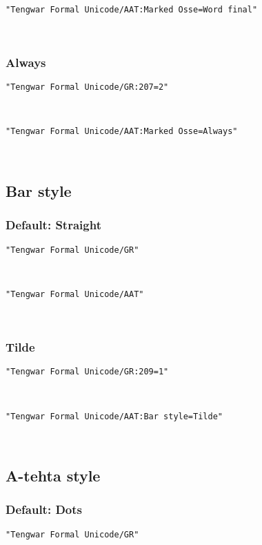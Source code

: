 \documentclass[11pt,a4paper]{article}
\begin{document}
\formalGRossefinal 

\noindent \texttt{"Tengwar Formal Unicode/AAT:Marked Osse=Word final"}

\formalAATossefinal 

\subsubsection{Always}

\texttt{"Tengwar Formal Unicode/GR:207=2"}

\formalGRossealways 

\noindent \texttt{"Tengwar Formal Unicode/AAT:Marked Osse=Always"}

\formalAATossealways 


\subsection{Bar style}

\subsubsection{Default: Straight}

\texttt{"Tengwar Formal Unicode/GR"}

\formalGR 

\noindent \texttt{"Tengwar Formal Unicode/AAT"}

\formalAAT 

\subsubsection{Tilde}

\texttt{"Tengwar Formal Unicode/GR:209=1"}

\formalGRtilde 

\noindent \texttt{"Tengwar Formal Unicode/AAT:Bar style=Tilde"}

\formalAATtilde 


\subsection{A-tehta style}

\subsubsection{Default: Dots}

\texttt{"Tengwar Formal Unicode/GR"}
\end{document}
